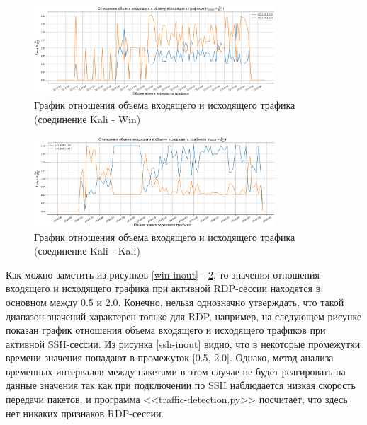 \documentclass[bachelor, och, coursework]{SCWorks}
\begin{document}


\begin{figure}[H]
  \centering
  \includegraphics[width=0.8\textwidth]{photo/inout-kalwin.png}
  \caption{График отношения объема входящего и исходящего трафика (соединение Kali - Win)}
  \label{kalwin-inout}
\end{figure}


\begin{figure}[H]
  \centering
  \includegraphics[width=0.8\textwidth]{photo/inout-kali.png}
  \caption{График отношения объема входящего и исходящего трафика (соединение Kali - Kali)}
  \label{kali-inout}
\end{figure}

Как можно заметить из рисунков \ref{win-inout} - \ref{kali-inout}, то значения отношения входящего и исходящего трафика
при активной RDP-сессии находятся в основном между 0.5 и 2.0. Конечно, нельзя однозначно утверждать, что такой диапазон
значений характерен только для RDP, например, на следующем рисунке показан график отношения объема входящего и
исходящего трафиков при активной SSH-сессии. Из рисунка \ref{ssh-inout}
видно, что в некоторые промежутки времени значения попадают в промежуток [0.5, 2.0]. Однако, метод анализа временных интервалов между пакетами
в этом случае не будет реагировать на данные значения так как при подключении по SSH наблюдается низкая скорость передачи пакетов,
и программа <<traffic-detection.py>> посчитает, что здесь нет никаких признаков RDP-сессии.
\end{document}
